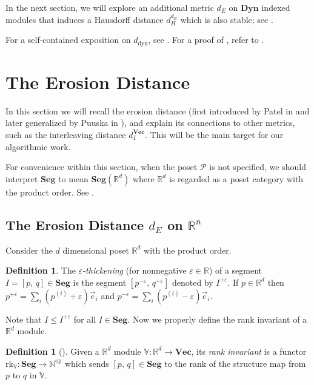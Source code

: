 \documentclass[a4paper,UKenglish,thm-restate]{article}
\theoremstyle{definition}
\newtheorem{definition}[theorem]{Definition}
\def\bdyn{\mathbf{Dyn}}
\def\bvec{\mathbf{Vec}}
\begin{document}
    In the next section, we will explore an additional metric $d_E$ on $\bdyn$ indexed modules that induces a Hausdorff distance $d_H^{d_E}$ which is also stable; see .
    
    For a self-contained exposition on $d_{\text{dyn}}$, see . For a proof of , refer to .

\section{The Erosion Distance}
    In this section we will recall the erosion distance (first introduced by Patel in \cite{patelerosion} and later generalized by Puuska in \cite{puuskaerosion}), and explain its connections to other metrics, such as the interleaving distance $d_I^{\bvec}$. This will be the main target for our algorithmic work.

    For convenience within this section, when the poset $\mathcal{P}$ is not specified, we should interpret $\mathbf{Seg}$ to mean $\mathbf{Seg}(\mathbb{R}^d)$ where $\mathbb{R}^d$ is regarded as a poset category with the product order. See .
    
    \subsection{The Erosion Distance $d_E$ on $\mathbb{R}^n$}
        Consider the $d$ dimensional poset $\mathbb{R}^d$ with the product order. 

        \begin{definition}
            The \emph{$\varepsilon$-thickening} (for nonnegative $\varepsilon\in\mathbb{R}$) of a segment $I=[p,\,q]\in\mathbf{Seg}$ is the segment $[p^{-\varepsilon},\,q^{+\varepsilon}]$ denoted by $I^{+\varepsilon}$. If $p\in\mathbb{R}^d$ then $p^{+\varepsilon}=\sum_i (p^{(i)} +\varepsilon )\vec{e}_i$ and $p^{-\varepsilon}=\sum_i (p^{(i)} -\varepsilon )\vec{e}_i$.
        \end{definition}

        Note that $I\leq I^{+\varepsilon}$ for all $I\in\mathbf{Seg}$. Now we properly define the rank invariant of a $\mathbb{R}^d$ module.

        \begin{definition}[\cite{rankinv}]
            Given a $\mathbb{R}^d$ module $\mathbb{V}:\mathbb{R}^d \to \bvec$, its \emph{rank invariant} is a functor $\mathrm{rk}_\mathbb{V}:\mathbf{Seg}\to\mathbb{N}^\text{op}$ which sends $[p,\,q]\in\mathbf{Seg}$ to the rank of the structure map from $p$ to $q$ in $\mathbb{V}$.
        \end{definition}
\end{document}

